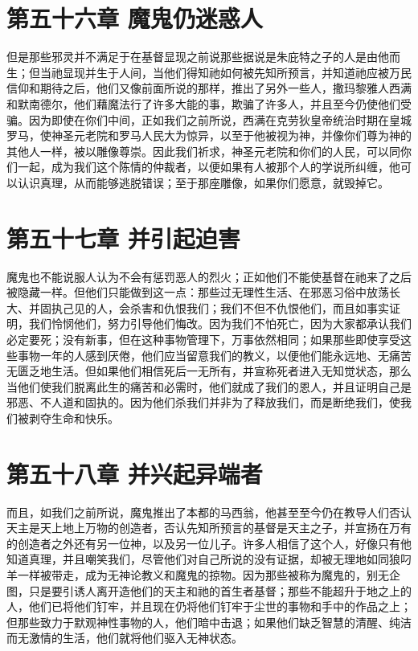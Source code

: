 
\section{第五十六章 魔鬼仍迷惑人}

但是那些邪灵并不满足于在基督显现之前说那些据说是朱庇特之子的人是由他而生；但当祂显现并生于人间，当他们得知祂如何被先知所预言，并知道祂应被万民信仰和期待之后，他们又像前面所说的那样，推出了另外一些人，撒玛黎雅人西满和默南德尔，他们藉魔法行了许多大能的事，欺骗了许多人，并且至今仍使他们受骗。因为即使在你们中间，正如我们之前所说，西满在克劳狄皇帝统治时期在皇城罗马，使神圣元老院和罗马人民大为惊异，以至于他被视为神，并像你们尊为神的其他人一样，被以雕像尊崇。因此我们祈求，神圣元老院和你们的人民，可以同你们一起，成为我们这个陈情的仲裁者，以便如果有人被那个人的学说所纠缠，他可以认识真理，从而能够逃脱错误；至于那座雕像，如果你们愿意，就毁掉它。\par


\section{第五十七章 并引起迫害}

魔鬼也不能说服人认为不会有惩罚恶人的烈火；正如他们不能使基督在祂来了之后被隐藏一样。但他们只能做到这一点：那些过无理性生活、在邪恶习俗中放荡长大、并固执己见的人，会杀害和仇恨我们；我们不但不仇恨他们，而且如事实证明，我们怜悯他们，努力引导他们悔改。因为我们不怕死亡，因为大家都承认我们必定要死；没有新事，但在这种事物管理下，万事依然相同；如果那些即使享受这些事物一年的人感到厌倦，他们应当留意我们的教义，以便他们能永远地、无痛苦无匮乏地生活。但如果他们相信死后一无所有，并宣称死者进入无知觉状态，那么当他们使我们脱离此生的痛苦和必需时，他们就成了我们的恩人，并且证明自己是邪恶、不人道和固执的。因为他们杀我们并非为了释放我们，而是断绝我们，使我们被剥夺生命和快乐。\par


\section{第五十八章 并兴起异端者}

而且，如我们之前所说，魔鬼推出了本都的马西翁，他甚至至今仍在教导人们否认天主是天上地上万物的创造者，否认先知所预言的基督是天主之子，并宣扬在万有的创造者之外还有另一位神，以及另一位儿子。许多人相信了这个人，好像只有他知道真理，并且嘲笑我们，尽管他们对自己所说的没有证据，却被无理地如同狼叼羊一样被带走，成为无神论教义和魔鬼的掠物。因为那些被称为魔鬼的，别无企图，只是要引诱人离开造他们的天主和祂的首生者基督；那些不能超升于地之上的人，他们已将他们钉牢，并且现在仍将他们钉牢于尘世的事物和手中的作品之上；但那些致力于默观神性事物的人，他们暗中击退；如果他们缺乏智慧的清醒、纯洁而无激情的生活，他们就将他们驱入无神状态。\par

